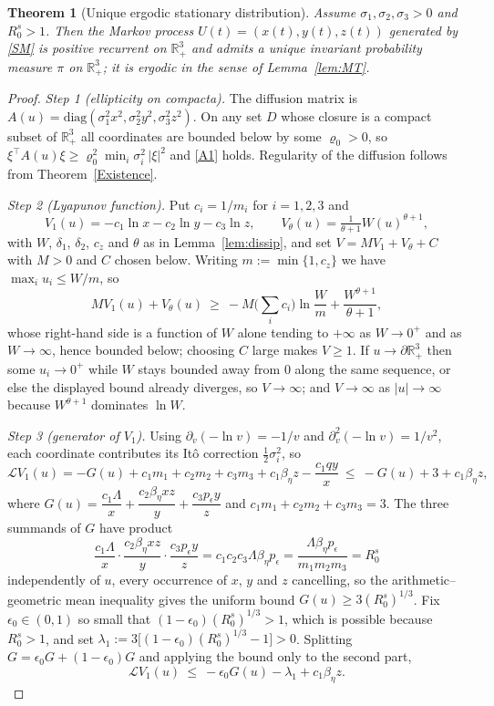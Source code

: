\documentclass{article}
\newtheorem{theorem}{Theorem}[section]
\newcommand{\betaeta}{\beta_\eta}
\newcommand{\peps}{p_\epsilon}
\newcommand{\Rs}{R_0^{s}}
\begin{document}
\begin{theorem}[Unique ergodic stationary distribution]\label{thm:ergodic}
Assume $\sigma_1,\sigma_2,\sigma_3>0$ and $\Rs>1$. Then the Markov process $U(t)=(x(t),y(t),z(t))$ generated by \eqref{SM} is positive recurrent on $\mathbb{R}^3_+$ and admits a unique invariant probability measure $\pi$ on $\mathbb{R}^3_+$; it is ergodic in the sense of Lemma~\ref{lem:MT}.
\end{theorem}

\begin{proof}
\emph{Step 1 (ellipticity on compacta).} The diffusion matrix is $A(u)=\mathrm{diag}(\sigma_1^2x^2,\sigma_2^2y^2,\sigma_3^2z^2)$. On any set $D$ whose closure is a compact subset of $\mathbb{R}^3_+$ all coordinates are bounded below by some $\varrho_0>0$, so $\xi^\top A(u)\xi\ge\varrho_0^2\min_i\sigma_i^2\,|\xi|^2$ and \eqref{A1} holds. Regularity of the diffusion follows from Theorem~\ref{Existence}.

\emph{Step 2 (Lyapunov function).} Put $c_i=1/m_i$ for $i=1,2,3$ and
\[
V_1(u)=-c_1\ln x-c_2\ln y-c_3\ln z,\qquad V_\theta(u)=\tfrac{1}{\theta+1}W(u)^{\theta+1},
\]
with $W$, $\delta_1$, $\delta_2$, $c_z$ and $\theta$ as in Lemma~\ref{lem:dissip}, and set $V=MV_1+V_\theta+C$ with $M>0$ and $C$ chosen below. Writing $m:=\min\{1,c_z\}$ we have $\max_iu_i\le W/m$, so
\[
MV_1(u)+V_\theta(u)\ \ge\ -M\Big(\textstyle\sum_ic_i\Big)\ln\frac{W}{m}+\frac{W^{\theta+1}}{\theta+1},
\]
whose right-hand side is a function of $W$ alone tending to $+\infty$ as $W\to0^+$ and as $W\to\infty$, hence bounded below; choosing $C$ large makes $V\ge1$. If $u\to\partial\mathbb{R}^3_+$ then some $u_i\to0^+$ while $W$ stays bounded away from $0$ along the same sequence, or else the displayed bound already diverges, so $V\to\infty$; and $V\to\infty$ as $|u|\to\infty$ because $W^{\theta+1}$ dominates $\ln W$.

\emph{Step 3 (generator of $V_1$).} Using $\partial_v(-\ln v)=-1/v$ and $\partial_v^2(-\ln v)=1/v^2$, each coordinate contributes its It\^o correction $\tfrac12\sigma_i^2$, so
\[
\mathcal{L}V_1(u)=-G(u)+c_1m_1+c_2m_2+c_3m_3+c_1\betaeta z-\frac{c_1qy}{x}\ \le\ -G(u)+3+c_1\betaeta z,
\]
where
$G(u)=\dfrac{c_1\Lambda}{x}+\dfrac{c_2\betaeta xz}{y}+\dfrac{c_3\peps y}{z}$
and $c_1m_1+c_2m_2+c_3m_3=3$. The three summands of $G$ have product
\[
\frac{c_1\Lambda}{x}\cdot\frac{c_2\betaeta xz}{y}\cdot\frac{c_3\peps y}{z}=c_1c_2c_3\Lambda\betaeta\peps=\frac{\Lambda\betaeta\peps}{m_1m_2m_3}=\Rs
\]
independently of $u$, every occurrence of $x$, $y$ and $z$ cancelling, so the arithmetic--geometric mean inequality gives the uniform bound $G(u)\ge3(\Rs)^{1/3}$. Fix $\epsilon_0\in(0,1)$ so small that $(1-\epsilon_0)(\Rs)^{1/3}>1$, which is possible because $\Rs>1$, and set $\lambda_1:=3\big[(1-\epsilon_0)(\Rs)^{1/3}-1\big]>0$. Splitting $G=\epsilon_0G+(1-\epsilon_0)G$ and applying the bound only to the second part,
\begin{equation}\label{eq:LV1}
\mathcal{L}V_1(u)\ \le\ -\epsilon_0G(u)-\lambda_1+c_1\betaeta z .
\end{equation}


\end{proof}
\end{document}
